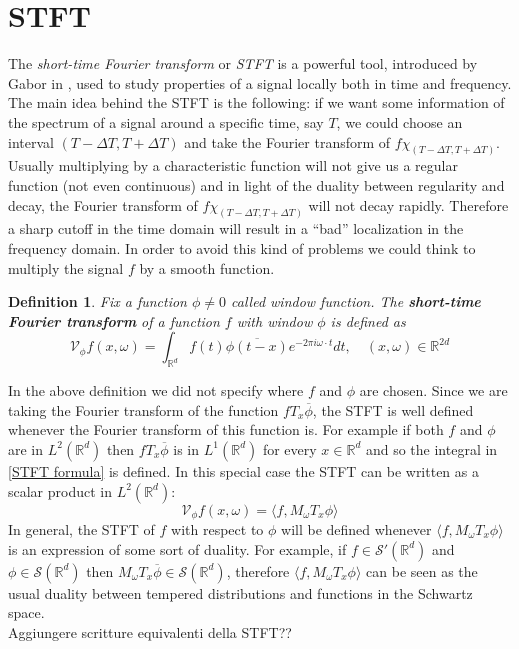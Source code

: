 \documentclass[corpo=11pt, stile=classica, tipotesi=custom,
greek, evenboxes, english]{toptesi}
\numberwithin{equation}{chapter}
\newtheorem{defi}[teo]{Definition}
\newcommand{\R}{\mathbb{R}} %
\newcommand{\V}{\mathcal{V}} %
\begin{document}
\section{STFT}\label{section STFT}
{\color{red}The \emph{short-time Fourier transform} or \emph{STFT} is a powerful tool, introduced by Gabor in \cite{gabor}, used to study properties of a signal locally both in time and frequency. The main idea behind the STFT is the following: if we want some information of the spectrum of a signal around a specific time, say $T$, we could choose an interval $(T-\Delta T, T + \Delta T)$ and take the Fourier transform of $f \chi_{(T-\Delta T, T + \Delta T)}$. Usually multiplying by a characteristic function will not give us a regular function (not even continuous) and in light of the duality between regularity and decay, the Fourier transform of $f \chi_{(T-\Delta T, T + \Delta T)}$ will not decay rapidly. Therefore a sharp cutoff in the time domain will result in a ``bad'' localization in the frequency domain. In order to avoid this kind of problems we could think to multiply the signal $f$ by a smooth function.}
\begin{defi}\label{STFT def}
	Fix a function $\phi \neq 0$ called \emph{window function}. The \textbf{short-time Fourier transform} of a function $f$ with window $\phi$ is defined as
	\begin{equation}\label{STFT formula}
		\V_{\phi}f(x,\omega) = \int_{\R^d} f(t)\overline{\phi(t-x)}e^{-2 \pi i \omega \cdot t} dt, \quad (x,\omega) \in \R^{2d}
	\end{equation}
\end{defi}
In the above definition we did not specify where $f$ and $\phi$ are chosen. Since we are taking the Fourier transform of the function $f T_x\overline{\phi}$, the STFT is well defined whenever the Fourier transform of this function is. For example if both $f$ and $\phi$ are in $L^2(\R^d)$ then $f T_x\overline{\phi}$ is in $L^1(\R^d)$ for every $x \in \R^d$ and so the integral in \eqref{STFT formula} is defined. In this special case the STFT can be written as a scalar product in $L^2(\R^d)$:
\begin{equation*}
	\V_{\phi}f(x,\omega) = \langle f, M_{\omega} T_x \phi \rangle
\end{equation*}
In general, the STFT of $f$ with respect to $\phi$ will be defined whenever  $\langle f, M_{\omega} T_x \phi \rangle$ is an expression of some sort of duality. For example, if $f \in \mathcal{S}'(\R^d)$ and $\phi \in \mathcal{S}(\R^d)$ then $M_{\omega} T_x \overline{\phi} \in \mathcal{S}(\R^d)$, therefore $\langle f, M_{\omega} T_x \phi \rangle$ can be seen as the usual duality between tempered distributions and functions in the Schwartz space.\\
{\color{blue} Aggiungere scritture equivalenti della STFT??}
\end{document}

